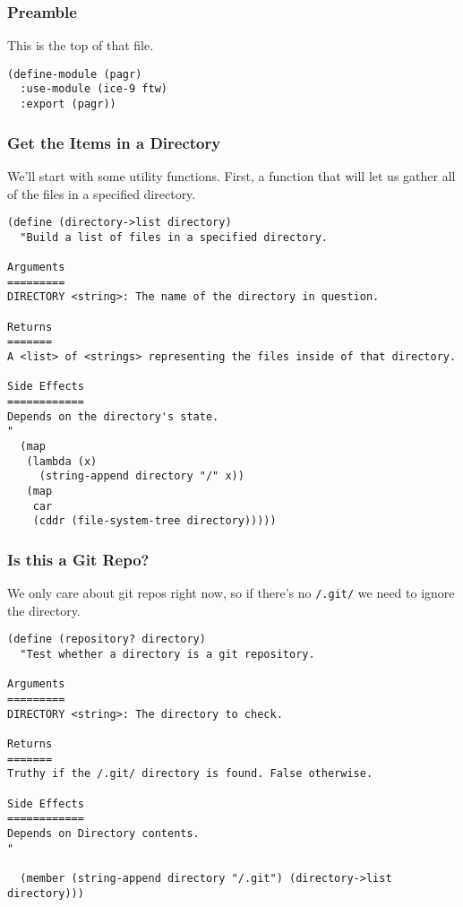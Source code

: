 \documentclass[11pt]{article}
\begin{document}
\subsubsection{Preamble}
\label{sec:orgf796110}
This is the top of that file.

\begin{verbatim}
(define-module (pagr)
  :use-module (ice-9 ftw)
  :export (pagr))
\end{verbatim}

\subsubsection{Get the Items in a Directory}
\label{sec:org50faf0c}
We'll start with some utility functions. First, a function that will let us
gather all of the files in a specified directory.

\begin{verbatim}
(define (directory->list directory)
  "Build a list of files in a specified directory.

Arguments
=========
DIRECTORY <string>: The name of the directory in question.

Returns
=======
A <list> of <strings> representing the files inside of that directory.

Side Effects
============
Depends on the directory's state.
"
  (map
   (lambda (x)
     (string-append directory "/" x))
   (map
    car
    (cddr (file-system-tree directory)))))
\end{verbatim}

\subsubsection{Is this a Git Repo?}
\label{sec:org66c8aed}
We only care about git repos right now, so if there's no \texttt{/.git/} we need to
ignore the directory.

\begin{verbatim}
(define (repository? directory)
  "Test whether a directory is a git repository.

Arguments
=========
DIRECTORY <string>: The directory to check.

Returns
=======
Truthy if the /.git/ directory is found. False otherwise.

Side Effects
============
Depends on Directory contents.
"

  (member (string-append directory "/.git") (directory->list directory)))
\end{verbatim}
\end{document}
